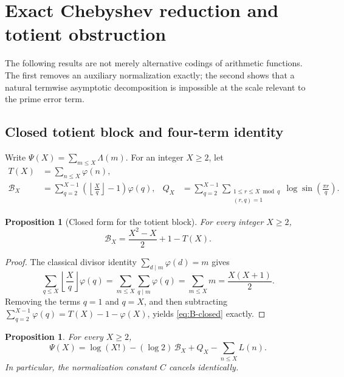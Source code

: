 \documentclass[11pt]{amsart}
\numberwithin{equation}{section}
\newtheorem{proposition}[theorem]{Proposition}
\theoremstyle{definition}
\theoremstyle{remark}
\begin{document}
\section{Exact Chebyshev reduction and totient obstruction}
\label{sec:chebyshev-obstruction}

The following results are not merely alternative codings of arithmetic
functions.  The first removes an auxiliary normalization exactly; the second
shows that a natural termwise asymptotic decomposition is impossible at the
scale relevant to the prime error term.

\subsection{Closed totient block and four-term identity}

Write \(\Psi(X)=\sum_{m\leq X}\Lambda(m)\).  For an integer \(X\geq2\),
let
\begin{align}
 T(X)&=\sum_{n\leq X}\varphi(n),\label{eq:T-def}\\
 \mathcal B_X&=\sum_{q=2}^{X-1}
 \left(\left\lfloor\frac Xq\right\rfloor-1\right)\varphi(q),
 &Q_X&=\sum_{q=2}^{X-1}
 \sum_{\substack{1\leq r\leq X\bmod q\\(r,q)=1}}
 \log\sin\!\left(\frac{\pi r}{q}\right).
 \label{eq:BQ}
\end{align}

\begin{proposition}[Closed form for the totient block]\label{prop:B-closed}
For every integer \(X\geq2\),
\begin{equation}\label{eq:B-closed}
 \mathcal B_X=\frac{X^2-X}{2}+1-T(X).
\end{equation}
\end{proposition}

\begin{proof}
The classical divisor identity \(\sum_{d\mid m}\varphi(d)=m\) gives
\[
 \sum_{q\leq X}\left\lfloor\frac Xq\right\rfloor\varphi(q)
 =\sum_{m\leq X}\sum_{q\mid m}\varphi(q)
 =\sum_{m\leq X}m=\frac{X(X+1)}2.
\]
Removing the terms \(q=1\) and \(q=X\), and then subtracting
\(\sum_{q=2}^{X-1}\varphi(q)=T(X)-1-\varphi(X)\), yields
\eqref{eq:B-closed} exactly.
\end{proof}

\begin{proposition}\label{prop:Chebyshev}
For every \(X\geq2\),
\begin{equation}\label{eq:Chebyshev}
 \boxed{\displaystyle
 \Psi(X)=\log(X!)-(\log2)\,\mathcal B_X+Q_X
 -\sum_{n\leq X}L(n).}
\end{equation}
In particular, the normalization constant \(C\) cancels identically.
\end{proposition}
\end{document}
